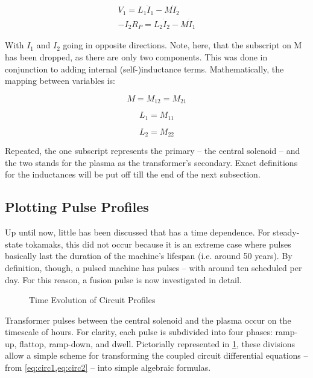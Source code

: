 \begin{align}
	\label{eq:circ1}
	V_1 = L_1 \dot I_1 - M \dot I_2 \\
	\label{eq:circ2}
	-I_2 R_P = L_2 \dot I_2 - M \dot I_1
\end{align}

With $I_1$ and $I_2$ going in opposite directions. Note, here, that the subscript on M has been dropped, as there are only two components. This was done in conjunction to adding internal (self-)inductance terms. Mathematically, the mapping between variables is:

\begin{equation}
	M = M_{12} = M_{21}
\end{equation}

\begin{equation}
	L_1 = M_{11}\end{equation}

\begin{equation}
	L_2 = M_{22}
\end{equation}

Repeated, the one subscript represents the primary -- the central solenoid -- and the two stands for the plasma as the transformer's secondary. Exact definitions for the inductances will be put off till the end of the next subsection.

\subsection{Plotting Pulse Profiles}

Up until now, little has been discussed that has a time dependence. For steady-state tokamaks, this did not occur because it is an extreme case where pulses basically last the duration of the machine's lifespan (i.e. around 50 years). By definition, though, a pulsed machine has pulses -- with around ten scheduled per day. For this reason, a fusion pulse is now investigated in detail.

\begin{figure}[h!]
\centering

\caption{Time Evolution of Circuit Profiles}
\label{fig:circuit_profiles}
\end{figure}

Transformer pulses between the central solenoid and the plasma occur on the timescale of hours. For clarity, each pulse is subdivided into four phases: ramp-up, flattop, ramp-down, and dwell. Pictorially represented in \cref{fig:circuit_profiles}, these divisions allow a simple scheme for transforming the coupled circuit differential equations -- from \cref{eq:circ1,eq:circ2} -- into simple algebraic formulas. 


